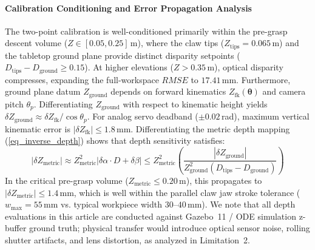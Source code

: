 \documentclass[journal]{IEEEtran}
\begin{document}
\paragraph{Calibration Conditioning and Error Propagation Analysis}
The two-point calibration is well-conditioned primarily within the pre-grasp descent volume ($Z \in [0.05, 0.25]$\,m), where the claw tips ($Z_{\text{tips}} = 0.065$\,m) and the tabletop ground plane provide distinct disparity setpoints ($D_{\text{tips}} - D_{\text{ground}} \ge 0.15$). At higher elevations ($Z > 0.35$\,m), optical disparity compresses, expanding the full-workspace $RMSE$ to $17.41$\,mm. Furthermore, ground plane datum $Z_{\text{ground}}$ depends on forward kinematics $Z_{\text{fk}}(\boldsymbol{\theta})$ and camera pitch $\theta_p$. Differentiating $Z_{\text{ground}}$ with respect to kinematic height yields $\delta Z_{\text{ground}} \approx \delta Z_{\text{fk}} / \cos\theta_p$. For analog servo deadband ($\pm 0.02$\,rad), maximum vertical kinematic error is $|\delta Z_{\text{fk}}| \le 1.8$\,mm. Differentiating the metric depth mapping (\ref{eq_inverse_depth}) shows that depth sensitivity satisfies:
\begin{equation}
|\delta Z_{\text{metric}}| \approx Z_{\text{metric}}^2 |\delta \alpha \cdot D + \delta \beta| \le Z_{\text{metric}}^2 \left( \frac{|\delta Z_{\text{ground}}|}{Z_{\text{ground}}^2 (D_{\text{tips}} - D_{\text{ground}})} \right)
\end{equation}
In the critical pre-grasp volume ($Z_{\text{metric}} \le 0.20$\,m), this propagates to $|\delta Z_{\text{metric}}| \le 1.4$\,mm, which is well within the parallel claw jaw stroke tolerance ($w_{\text{max}} = 55$\,mm vs. typical workpiece width $30\text{--}40$\,mm). We note that all depth evaluations in this article are conducted against Gazebo~11 / ODE simulation z-buffer ground truth; physical transfer would introduce optical sensor noise, rolling shutter artifacts, and lens distortion, as analyzed in Limitation~2.
\end{document}
